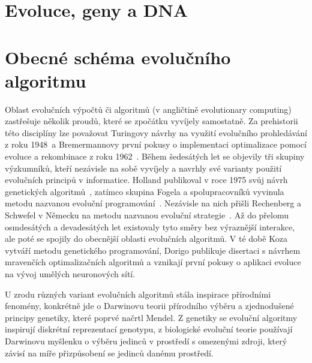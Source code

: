 
\section{Evoluce, geny a DNA}


\section{Obecné schéma evolučního algoritmu}

Oblast evolučních výpočtů či algoritmů (v angličtině evolutionary computing) zastřešuje několik proudů, které se zpočátku vyvíjely samostatně. Za prehistorii této disciplíny lze považovat Turingovy návrhy na využití evolučního prohledávání z roku 1948~\cite{Turing:1948}\missingref a Bremermannovy první pokusy o implementaci optimalizace pomocí evoluce a rekombinace z roku 1962~\cite{Bremermann:1962}\missingref. Během šedesátých let se objevily tři skupiny výzkumníků, kteří nezávisle na sobě vyvíjely a navrhly své varianty použití evolučních principů v informatice. Holland publikoval v roce 1975 svůj návrh genetických algoritmů~\cite{Holland:1992}, 
zatímco skupina Fogela a spolupracovníků vyvinula metodu nazvanou evoluční programování~\cite{Fogel:1995}. 
Nezávisle na nich přišli Rechenberg a Schwefel v Německu na metodu nazvanou evoluční strategie~\cite{Beyer:2002}.
Až do přelomu osmdesátých a devadesátých let existovaly tyto směry bez výraznější interakce, ale poté se spojily do obecnější oblasti evolučních algoritmů. V té době  Koza vytváří metodu genetického programování, Dorigo publikuje disertaci s návrhem mravenčích optimalizačních algoritmů a vznikají první pokusy o aplikaci evoluce na vývoj umělých neuronových sítí. 

U zrodu různých variant evolučních algoritmů stála inspirace přírodními fenomény, konkrétně jde o Darwinovu teorii přírodního výběru a zjednodušené principy genetiky, které poprvé načrtl Mendel. Z genetiky se evoluční algoritmy inspirují diskrétní reprezentací genotypu, z biologické evoluční teorie používají Darwinovu myšlenku o výběru jedinců v prostředí s omezenými zdroji, který závisí na míře přizpůsobení se jedinců danému prostředí.

